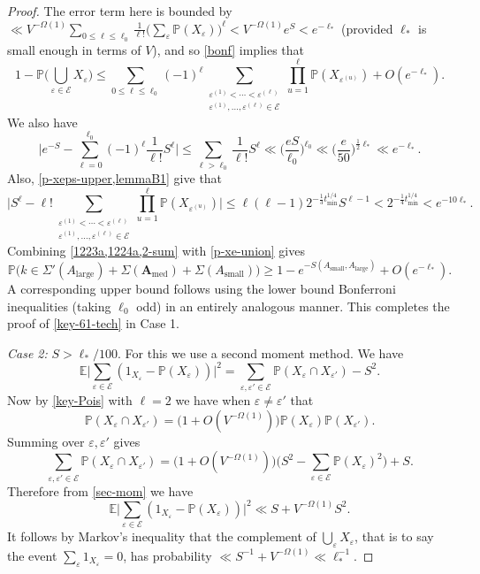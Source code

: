 \documentclass[11pt,reqno]{amsart}
\numberwithin{equation}{section}
\theoremstyle{definition}
\theoremstyle{remark}
\newcommand{\mb}{\mathbb}
\newcommand{\mbf}{\mathbf}
\newcommand{\eps}{\varepsilon}
\renewcommand{\le}{\leqslant}
\renewcommand{\ge}{\geqslant}
\def\sml{\operatorname{small}}
\def\lrg{\operatorname{large}}
\def\med{\operatorname{med}}
\begin{document}
\begin{proof}
The error term here is bounded by $\ll V^{-\Omega(1)} \sum_{0 \le \ell \le \ell_0} \frac{1}{\ell!} \big( \sum_{\eps} \mb{P}(X_{\eps}) \big)^{\ell} < V^{-\Omega(1)} e^{S} < e^{-\ell_*}$ (provided $\ell_*$ is small enough in terms of $V$), and so \cref{bonf} implies that 
\begin{equation}\label{1223a} 1  -  \mb{P} \big( \bigcup_{\eps \in \mathcal{E}} X_{\eps}\big) \le  \sum_{0 \le \ell \le \ell_0} (-1)^{\ell} \sum_{\substack{\eps^{(1)} < \cdots < \eps^{(\ell)} \\ \eps^{(1)},\dots,\eps^{(\ell)} \in \mathcal{E}}}  \prod_{u = 1}^{\ell} \mb{P}(X_{\eps^{(u)}}) + O(e^{-\ell_*}).\end{equation}
We also have
\begin{equation}\label{2-sum} \big| e^{-S} - \sum_{\ell = 0}^{\ell_0} (-1)^{\ell}\frac{1}{\ell!} S^{\ell} \big| \le \sum_{\ell > \ell_0} \frac{1}{\ell!} S^{\ell} \ll \big( \frac{eS}{\ell_0}\big)^{\ell_0} \ll \big(\frac{e}{50}\big)^{\frac{1}{2}\ell_*} \ll e^{-\ell_*}.\end{equation}
Also, \cref{p-xeps-upper,lemmaB1} give that 
\begin{equation}\label{1224a} \Big| S^{\ell} - \ell! \sum_{\substack{\eps^{(1)} < \cdots < \eps^{(\ell)} \\ \eps^{(1)},\dots,\eps^{(\ell)} \in \mathcal{E}}}\prod_{u = 1}^{\ell} \mb{P}(X_{\eps^{(u)}})\Big| \le \ell(\ell-1) 2^{-\frac{1}{3}t_{\min}^{1/4}} S^{\ell - 1} < 2^{-\frac{1}{4}t_{\min}^{1/4}} < e^{-10\ell_*}.\end{equation} 
Combining \cref{1223a,1224a,2-sum} with \cref{p-xe-union} gives
\[ \mb{P}\big( k \in \Sigma'(A_{\lrg}) + \Sigma(\mbf{A}_{\med}) + \Sigma(A_{\sml})\big) \ge 1 - e^{-S(A_{\sml},A_{\lrg})} + O(e^{-\ell_*}).\]
A corresponding upper bound follows using the lower bound Bonferroni inequalities (taking $\ell_0$ odd) in an entirely analogous manner. This completes the proof of \cref{key-61-tech} in Case 1.\vspace*{8pt}

\emph{Case 2:} $S > \ell_*/100$. For this we use a second moment method. We have
\begin{equation}\label{sec-mom}
\mb{E} \big| \sum_{\eps \in \mathcal{E}} ( 1_{X_{\eps}} - \mb{P}(X_{\eps})) \big|^2  = \sum_{\eps, \eps' \in \mathcal{E}} \mb{P}(X_{\eps} \cap X_{\eps'}) - S^2.
\end{equation}
Now by \cref{key-Pois} with $\ell =2$ we have when $\eps \neq \eps'$ that
\[ \mb{P}(X_{\eps} \cap X_{\eps'}) = \big(1 + O(V^{-\Omega(1)})\big)  \mb{P}(X_{\eps}) \mb{P}(X_{\eps'}).\] Summing over $\eps, \eps'$ gives
\[ \sum_{\eps, \eps' \in \mathcal{E}}\mb{P}(X_{\eps} \cap X_{\eps'}) = \big(1 + O(V^{-\Omega(1)})\big) \Big( S^2  -  \sum_{\eps \in \mathcal{E}} \mb{P}(X_{\eps})^2\Big) + S.\]
Therefore from \cref{sec-mom} we have
\[ \mb{E} \big| \sum_{\eps \in \mathcal{E}} ( 1_{X_{\eps}} - \mb{P}(X_{\eps})) \big|^2 \ll S+ V^{-\Omega(1)} S^2.\] It follows by Markov's inequality that the complement of $\bigcup_{\eps} X_{\eps}$, that is to say the event $\sum_{\eps} 1_{X_{\eps}} = 0$, has probability $\ll S^{-1} + V^{-\Omega(1)} \ll \ell_*^{-1}$. 


\end{proof}
\end{document}
